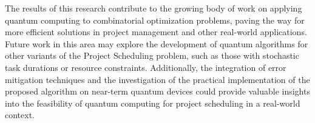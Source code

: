 The results of this research contribute to the growing body of work on applying quantum computing to combinatorial optimization problems, paving the way for more efficient solutions in project management and other real-world applications. Future work in this area may explore the development of quantum algorithms for other variants of the Project Scheduling problem, such as those with stochastic task durations or resource constraints. Additionally, the integration of error mitigation techniques and the investigation of the practical implementation of the proposed algorithm on near-term quantum devices could provide valuable insights into the feasibility of quantum computing for project scheduling in a real-world context.



